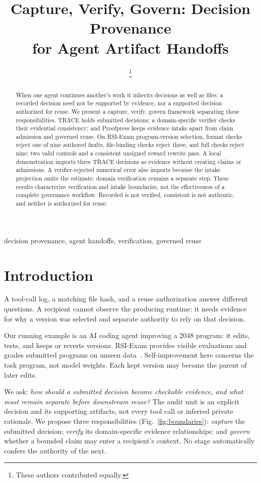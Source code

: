 \documentclass[conference]{IEEEtran}
\title{Capture, Verify, Govern: Decision Provenance\\for Agent Artifact Handoffs}
\author{
\IEEEauthorblockN{Oliver Muellerklein\IEEEauthorrefmark{1}}
\IEEEauthorblockA{University of California, Berkeley\\omuellerklein@berkeley.edu}
\and
\IEEEauthorblockN{Chenming Tang\IEEEauthorrefmark{1}}
\IEEEauthorblockA{Proofpress\\tangchenming0830@gmail.com}
\thanks{\IEEEauthorrefmark{1}These authors contributed equally.}}
\begin{document}
\maketitle
\begin{abstract}
When one agent continues another's work it inherits decisions as well as files; a recorded decision need not be supported by evidence, nor a supported decision authorized for reuse. We present a capture, verify, govern framework separating these responsibilities. TRACE holds submitted decisions; a domain-specific verifier checks their evidential consistency; and Proofpress keeps evidence intake apart from claim admission and governed reuse. On RSI-Exam program-version selection, format checks reject one of nine authored faults, file-binding checks reject three, and full checks reject nine; two valid controls and a consistent unsigned reward rewrite pass. A local demonstration imports three TRACE decisions as evidence without creating claims or admissions. A verifier-rejected numerical error also imports because the intake projection omits the estimate: domain verification remains a separate step. These results characterize verification and intake boundaries, not the effectiveness of a complete governance workflow. Recorded is not verified, consistent is not authentic, and neither is authorized for reuse.
\end{abstract}
\begin{IEEEkeywords}
decision provenance, agent handoffs, verification, governed reuse
\end{IEEEkeywords}

\section{Introduction}
A tool-call log, a matching file hash, and a reuse authorization answer different questions. A recipient cannot observe the producing runtime: it needs evidence for why a version was selected and separate authority to rely on that decision.

Our running example is an AI coding agent improving a 2048 program: it edits, tests, and keeps or reverts versions. RSI-Exam provides visible evaluations and grades submitted programs on unseen data~\cite{rsiexam}. Self-improvement here concerns the task program, not model weights. Each kept version may become the parent of later edits.

We ask: \emph{how should a submitted decision become checkable evidence, and what must remain separate before downstream reuse?} The audit unit is an explicit decision and its supporting artifacts, not every tool call or inferred private rationale. We propose three responsibilities (Fig.~\ref{fig:boundaries}): \emph{capture} the submitted decision; \emph{verify} its domain-specific evidence relationships; and \emph{govern} whether a bounded claim may enter a recipient's context. No stage automatically confers the authority of the next.
\end{document}
